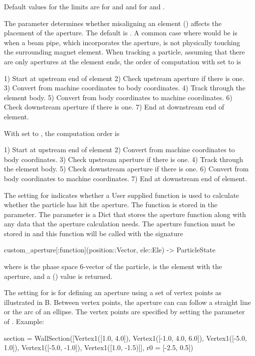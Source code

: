 Default values for the limits are  for  and  and 
 for  and .

The  parameter determines whether misaligning an element 
() affects the placement of the aperture. The default is . 
A common case where  would be  is when a beam pipe,
which incorporates the aperture, is not physically touching the surrounding magnet element. 
When tracking a particle, assuming that there are only apertures at the element ends, 
the order of computation with  set to  is
\begin{example}
  1) Start at upstream end of element
  2) Check upstream aperture if there is one.
  3) Convert from machine coordinates to body coordinates.
  4) Track through the element body.
  5) Convert from body coordinates to machine coordinates.
  6) Check downstream aperture if there is one.
  7) End at downstream end of element.
\end{example}
With  set to , the computation order is 
\begin{example}
  1) Start at upstream end of element
  2) Convert from machine coordinates to body coordinates.
  3) Check upstream aperture if there is one.
  4) Track through the element body.
  5) Check downstream aperture if there is one.
  6) Convert from body coordinates to machine coordinates.
  7) End at downstream end of element.
\end{example}

The  setting for  indicates whether a User supplied function
is used to calculate whether the particle has hit the aperture. The function is stored
in the  parameter. The  parameter is a Dict that stores
the aperture function along with any data that the aperture calculation needs. The aperture
function must be stored in  and this function will be
called with the signature
\begin{example}
  custom_aperture[:function](position::Vector, ele::Ele) -> ParticleState
\end{example}
where  is the phase space 6-vector of the particle,  is the element 
with the aperture, and a  () value is returned.

The  setting for  is for defining an aperture using a 
set of vertex points as illustrated in B. Between vertex points, the aperture
can can follow a straight line or the arc of an ellipse. The vertex points are specified by
setting the  parameter of . Example:
\begin{example}
  section = WallSection([Vertex1([1.0, 4.0]), Vertex1([-1.0, 4.0, 6.0]), 
                         Vertex1([-5.0, 1.0]), Vertex1([-5.0, -1.0]), 
                          Vertex1([1.0, -1.5)]], r0 = [-2.5, 0.5]) 
\end{example}

